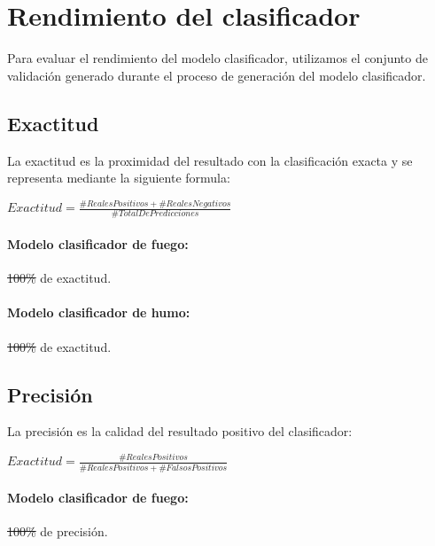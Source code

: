 \section{Rendimiento del clasificador}

\noindent Para evaluar el rendimiento del modelo clasificador, utilizamos el conjunto de validación generado durante el proceso de generación del modelo clasificador.

\subsection{Exactitud}

\noindent La exactitud es la proximidad del resultado con la clasificación exacta y se representa mediante la siguiente formula:

\begin{center}
\begin{math}
Exactitud = \frac{\# RealesPositivos + \# RealesNegativos}{\# TotalDePredicciones}
\end{math}
\end{center}

\paragraph{Modelo clasificador de fuego:} \sout{100\%} de exactitud.

\paragraph{Modelo clasificador de humo:} \sout{100\%} de exactitud.

\subsection{Precisión}

\noindent La precisión es la calidad del resultado positivo del clasificador:

\begin{center}
\begin{math}
Exactitud = \frac{\# RealesPositivos}{\# RealesPositivos + \# FalsosPositivos}
\end{math}
\end{center}

\paragraph{Modelo clasificador de fuego:} \sout{100\%} de precisión.

